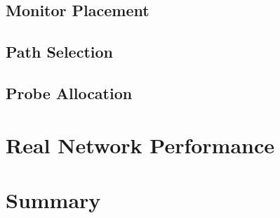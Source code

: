 \subsection{Monitor Placement}
\subsection{Path Selection}
\subsection{Probe Allocation}

\section{Real Network Performance}
\label{sec:Rrealnetworkperformance}

\section{Summary}
